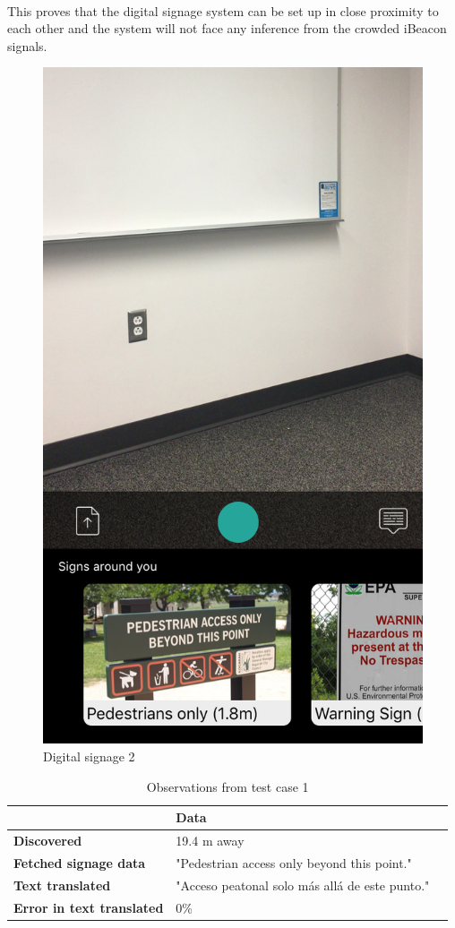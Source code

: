 \documentclass[12pt]{article}
\begin{document}
\paragraph{}This proves that the digital signage system can be set up in close proximity to each other and the system will not face any inference from the crowded iBeacon signals. 

       \begin{figure}[H]
	\centering
	\includegraphics[width=0.5\linewidth]{media/case1.png}
	\caption{Digital signage 2}
	\label{fig:eng}
\end{figure} 

\begin{table}%
    \centering
    \caption{Observations from test case 1} 
    \label{my-label}
       \begin{tabular}{|p{30mm}|p{55mm}|p{35mm}|}
 \hline
  & \textbf{Data}  \\ [0.5ex] 
 \hline\hline
 \textbf{Discovered} & 19.4 m away  \\ 
 \hline
 \textbf{Fetched signage data} & "Pedestrian access only beyond this point."  \\
 \hline
 \textbf{Text translated} &  "Acceso peatonal solo más allá de este punto." \\
 \hline
 \textbf{Error in text translated} & 0\%   \\ [1ex] 
 \hline
    \end{tabular}
\end{table}
\end{document}
